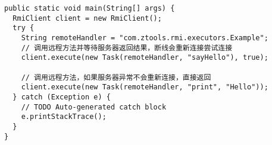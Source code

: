\documentclass[11pt]{article}
\begin{document}
\begin{verbatim}
public static void main(String[] args) {
  RmiClient client = new RmiClient();
  try {
    String remoteHandler = "com.ztools.rmi.executors.Example";
    // 调用远程方法并等待服务器返回结果，断线会重新连接尝试连接
    client.execute(new Task(remoteHandler, "sayHello"), true);

    // 调用远程方法，如果服务器异常不会重新连接，直接返回
    client.execute(new Task(remoteHandler, "print", "Hello"));
  } catch (Exception e) {
    // TODO Auto-generated catch block
    e.printStackTrace();
  }
}
\end{verbatim}
\end{document}
